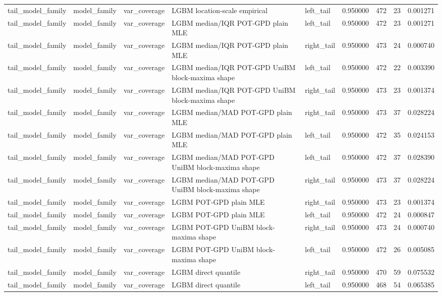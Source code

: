 \begin{tabular}{lllllrrr}
tail\_model\_family & model\_family & var\_coverage & LGBM location-scale empirical & left\_tail & 0.950000 & 472 & 23 & 0.001271 \\
tail\_model\_family & model\_family & var\_coverage & LGBM median/IQR POT-GPD plain MLE & left\_tail & 0.950000 & 472 & 23 & 0.001271 \\
tail\_model\_family & model\_family & var\_coverage & LGBM median/IQR POT-GPD plain MLE & right\_tail & 0.950000 & 473 & 24 & 0.000740 \\
tail\_model\_family & model\_family & var\_coverage & LGBM median/IQR POT-GPD UniBM block-maxima shape & left\_tail & 0.950000 & 472 & 22 & 0.003390 \\
tail\_model\_family & model\_family & var\_coverage & LGBM median/IQR POT-GPD UniBM block-maxima shape & right\_tail & 0.950000 & 473 & 23 & 0.001374 \\
tail\_model\_family & model\_family & var\_coverage & LGBM median/MAD POT-GPD plain MLE & right\_tail & 0.950000 & 473 & 37 & 0.028224 \\
tail\_model\_family & model\_family & var\_coverage & LGBM median/MAD POT-GPD plain MLE & left\_tail & 0.950000 & 472 & 35 & 0.024153 \\
tail\_model\_family & model\_family & var\_coverage & LGBM median/MAD POT-GPD UniBM block-maxima shape & left\_tail & 0.950000 & 472 & 37 & 0.028390 \\
tail\_model\_family & model\_family & var\_coverage & LGBM median/MAD POT-GPD UniBM block-maxima shape & right\_tail & 0.950000 & 473 & 37 & 0.028224 \\
tail\_model\_family & model\_family & var\_coverage & LGBM POT-GPD plain MLE & right\_tail & 0.950000 & 473 & 23 & 0.001374 \\
tail\_model\_family & model\_family & var\_coverage & LGBM POT-GPD plain MLE & left\_tail & 0.950000 & 472 & 24 & 0.000847 \\
tail\_model\_family & model\_family & var\_coverage & LGBM POT-GPD UniBM block-maxima shape & right\_tail & 0.950000 & 473 & 24 & 0.000740 \\
tail\_model\_family & model\_family & var\_coverage & LGBM POT-GPD UniBM block-maxima shape & left\_tail & 0.950000 & 472 & 26 & 0.005085 \\
tail\_model\_family & model\_family & var\_coverage & LGBM direct quantile & right\_tail & 0.950000 & 470 & 59 & 0.075532 \\
tail\_model\_family & model\_family & var\_coverage & LGBM direct quantile & left\_tail & 0.950000 & 468 & 54 & 0.065385 \\

\end{tabular}

